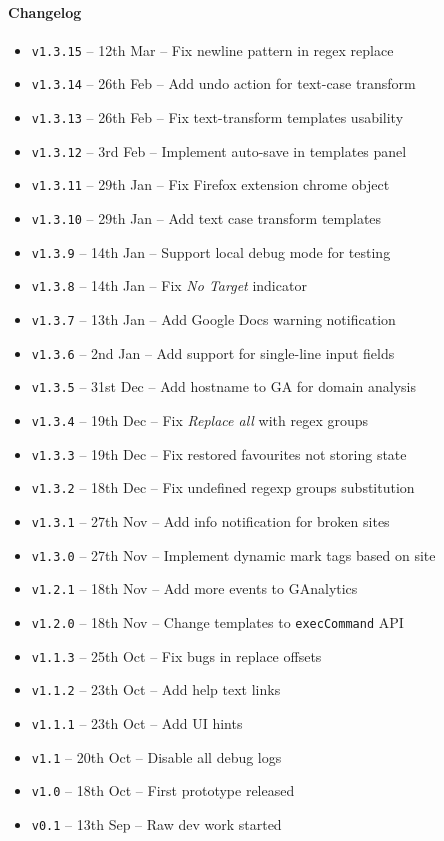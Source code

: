 \documentclass[bsc,frontabs,twoside,singlespacing,parskip,deptreport]{infthesis}
\providecommand{\tightlist}{%
  \setlength{\itemsep}{0pt}\setlength{\parskip}{0pt}}
\begin{document}
\paragraph*{Changelog}
\begin{itemize}
\tightlist
\item
\texttt{v1.3.15} -- 12th Mar -- Fix newline pattern in regex replace
\item
\texttt{v1.3.14} -- 26th Feb -- Add undo action for text-case transform
\item
\texttt{v1.3.13} -- 26th Feb -- Fix text-transform templates usability
\item
\texttt{v1.3.12} -- 3rd Feb -- Implement auto-save in templates panel
\item
\texttt{v1.3.11} -- 29th Jan -- Fix Firefox extension chrome object
\item
\texttt{v1.3.10} -- 29th Jan -- Add text case transform templates
\item
\texttt{v1.3.9} -- 14th Jan -- Support local debug mode for testing
\item
\texttt{v1.3.8} -- 14th Jan -- Fix \textit{No Target} indicator
\item
\texttt{v1.3.7} -- 13th Jan -- Add Google Docs warning notification
\item
\texttt{v1.3.6} -- 2nd Jan -- Add support for single-line input fields
\item
\texttt{v1.3.5} -- 31st Dec -- Add hostname to GA for domain analysis
\item
\texttt{v1.3.4} -- 19th Dec -- Fix \textit{Replace all} with regex groups
\item
\texttt{v1.3.3} -- 19th Dec -- Fix restored favourites not storing state
\item
\texttt{v1.3.2} -- 18th Dec -- Fix undefined regexp groups substitution
\item
\texttt{v1.3.1} -- 27th Nov -- Add info notification for broken sites
\item
\texttt{v1.3.0} -- 27th Nov -- Implement dynamic mark tags based on site
\item
\texttt{v1.2.1} -- 18th Nov -- Add more events to GAnalytics
\item
\texttt{v1.2.0} -- 18th Nov -- Change templates to \texttt{execCommand} API
\item
\texttt{v1.1.3} -- 25th Oct -- Fix bugs in replace offsets
\item
\texttt{v1.1.2} -- 23th Oct -- Add help text links
\item
\texttt{v1.1.1} -- 23th Oct -- Add UI hints
\item
\texttt{v1.1} -- 20th Oct -- Disable all debug logs
\item
\texttt{v1.0} -- 18th Oct -- First prototype released
\item
\texttt{v0.1} -- 13th Sep -- Raw dev work started
\end{itemize}
\end{document}
